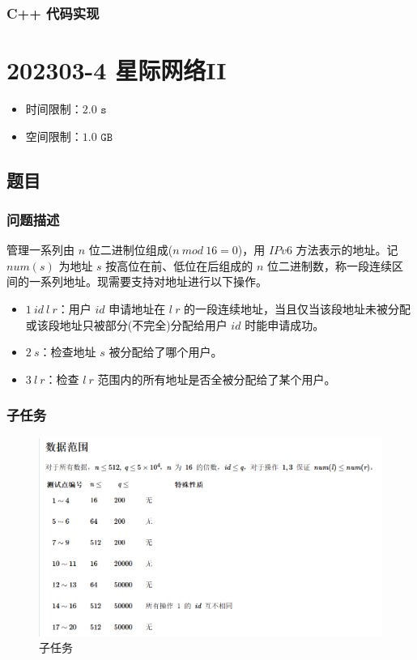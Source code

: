 \documentclass[UTF8, 12pt, a4paper, oneside]{ctexart}
\begin{document}
\subsubsection{C++ 代码实现}



\newpage
\section{202303-4 星际网络II}
\begin{itemize}
    \item 时间限制：$2.0\texttt{ s}$
    \item 空间限制：$1.0\texttt{ GB}$
\end{itemize}
\subsection{题目}
\subsubsection{问题描述}
\par 管理一系列由 $n$ 位二进制位组成($n \ mod \ 16 = 0$)，用 $IPv6$ 方法表示的地址。记 $num(s)$ 为地址 $s$ 按高位在前、低位在后组成的 $n$ 位二进制数，称一段连续区间的一系列地址。现需要支持对地址进行以下操作。
\begin{itemize}
    \item $1 \ id \ l \ r$：用户 $id$ 申请地址在 $l ~ r$ 的一段连续地址，当且仅当该段地址未被分配或该段地址只被部分(不完全)分配给用户 $id$ 时能申请成功。
    \item $2 \ s$：检查地址 $s$ 被分配给了哪个用户。
    \item $3 \ l \ r$：检查 $l~r$ 范围内的所有地址是否全被分配给了某个用户。
\end{itemize}
\subsubsection{子任务}
\begin{figure}[htbp]
    \centering
    \includegraphics*[width =4.5in]{202303-4 子任务.png}
    \caption{子任务}
\end{figure}
\end{document}
